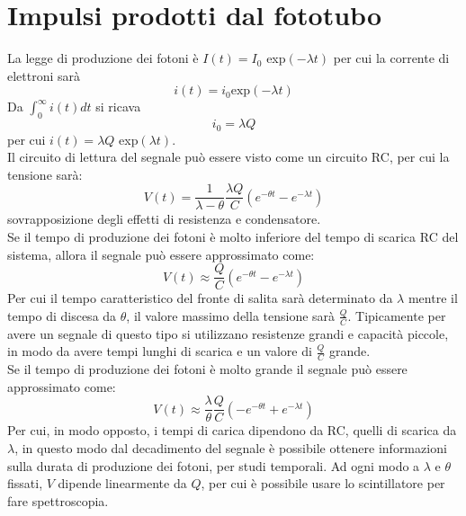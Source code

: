 \section{Impulsi prodotti dal fototubo}
La legge di produzione dei fotoni \`e $I(t) = I_0$ exp$(-\lambda t)$ per cui la corrente di elettroni sar\`a
\begin{equation*}
 i(t) = i_0 \text{exp}(-\lambda t)
\end{equation*}
Da $\int_0^{\infty} i(t) dt$ si ricava
\begin{equation*}
i_0 = \lambda Q
\end{equation*} 
per cui $i(t) = \lambda Q$ exp$(\lambda t)$.\\
Il circuito di lettura del segnale pu\`o essere visto come un circuito RC, per cui la tensione sar\`a:
\begin{equation*}
V(t) = \frac{1}{\lambda - \theta} \frac{\lambda Q}{C} (e^{-\theta t} - e^{-\lambda t})
\end{equation*}
sovrapposizione degli effetti di resistenza e condensatore.\\
Se il tempo di produzione dei fotoni \`e molto inferiore del tempo di scarica RC del sistema, allora il segnale pu\`o essere approssimato come:
\begin{equation*}
V(t) \approx \frac{Q}{C}  (e^{-\theta t} - e^{-\lambda t})
\end{equation*}
Per cui il tempo caratteristico del fronte di salita sar\`a determinato da $\lambda$ mentre il tempo di discesa da $\theta$, il valore
massimo della tensione sar\`a $\frac{Q}{C}$.
Tipicamente per avere un segnale di questo tipo si utilizzano resistenze grandi e capacit\`a piccole, in modo da avere tempi lunghi di scarica e un 
valore di $\frac{Q}{C}$ grande.\\
Se il tempo di produzione dei fotoni \`e molto grande il segnale pu\`o essere approssimato come:
\begin{equation*}
V(t) \approx \frac{\lambda}{\theta}\frac{Q}{C} (-e^{-\theta t} + e^{-\lambda t}) 
\end{equation*}
Per cui, in modo opposto, i tempi di carica dipendono da RC, quelli di scarica da $\lambda$,
in questo modo dal decadimento del segnale \`e possibile ottenere informazioni sulla durata di produzione dei fotoni, per studi temporali.
Ad ogni modo a $\lambda$ e $\theta$ fissati, $V$ dipende linearmente da $Q$, per cui \`e possibile usare lo scintillatore per fare spettroscopia.
